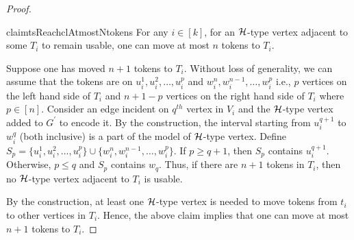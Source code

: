 \begin{proof}
\begin{restatable}{claim}{tsReachclAtmostNtokens}
\label{cl:atmostn+1tokens} 
For any $i \in [k]$,
{for an ${\mathcal H}$-type vertex adjacent to some $T_i$ to remain
usable, one can move at most $n$ tokens to $T_i$.}
\end{restatable}
\begin{claimproof}
Suppose one has moved $n + 1$ tokens to  $T_i$.
Without loss of generality, we can assume that the tokens
are on $u_i^1,u_i^2,\ldots,u_i^p$ and
$w_i^n,w_i^{n-1},\ldots,w_i^p$
i.e., $p$ vertices on the left hand side of $T_i$
and $n+1-p$ vertices on the right hand side of $T_i$
where $p \in [n]$.
Consider an edge incident on $q^{th}$ vertex in $V_i$
and the ${\mathcal H}$-type vertex added to $G^{\prime}$ to encode it.
By the construction, the interval starting from $u_i^{q+1}$ to $w_i^q$
(both inclusive) is a part of the model of ${\mathcal H}$-type vertex.
Define $S_p = \{u_i^1,u_i^2,\ldots,u_i^p\}
\cup \{w_i^n,w_i^{n-1},\ldots,w_i^p\}$.
If $p\geq q+1$, then $S_p$ contains $u_i^{q+1}$.
Otherwise, $p\leq q$ and $S_p$ contains $w_q$.
Thus, if there are $n+1$ tokens in $T_i$, then no ${\mathcal H}$-type vertex
adjacent to $T_i$ is usable.
\end{claimproof}



\noindent By the construction, at least one ${\mathcal H}$-type vertex is needed
to move tokens from $t_i$ to other vertices in $T_i$.
Hence, the above claim implies that
one can move at most $n + 1$ tokens to $T_i$.


\end{proof}

